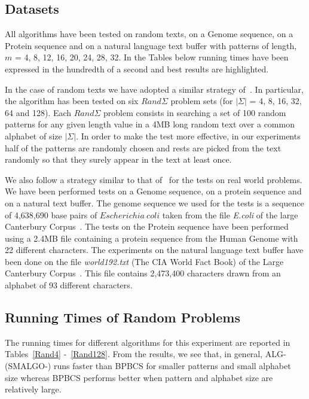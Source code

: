 \documentclass{llncs}
\newcommand{\rom}[1]{\uppercase\expandafter{\romannumeral #1\relax}}
\begin{document}
{\subsection{Datasets}
All algorithms have been tested on random texts, on a Genome sequence, on a Protein sequence and on a natural language text buffer with patterns of length, $m$ = 4, 8, 12, 16, 20, 24, 28, 32. In the Tables below running times have been expressed in the hundredth of a second and best results are highlighted.


In the case of random texts we have adopted a similar strategy of~\cite{CS,CCS}. In particular, the algorithm has been tested on six $Rand\Sigma$ problem sets (for $\vert\Sigma\vert$ = 4, 8, 16, 32, 64 and 128). Each $Rand\Sigma$ problem consists in searching a set of 100 random patterns for any given length value in a 4MB long random text over a common alphabet of size $\vert\Sigma\vert$. In order to make the test more effective, in our experiments half of the patterns are randomly chosen and rests are picked from the text randomly so that they surely appear in the text at least once. 



We also follow a strategy similar to that of~\cite{CS,CCS} for the tests on real world problems. 
We have been performed tests on a Genome sequence, on a protein sequence and on a natural text buffer. The genome sequence we used for the tests is a sequence of 4,638,690 base pairs of $Escherichia~ coli$ taken from the file \emph{E.coli} of the large Canterbury Corpus~\cite{corpus}.
The tests on the Protein sequence have been performed using a 2.4MB file containing a protein sequence from the Human Genome with 22 different characters. The experiments on the natural language text buffer have been done on the file \emph{world192.txt} (The CIA World Fact Book) of the Large Canterbury Corpus~\cite{corpus}. This file contains 2,473,400 characters drawn from an alphabet of 93 different characters.


\subsection{Running Times of Random Problems}

The running times for different algorithms for this experiment are reported in Tables~\ref{Rand4} -~\ref{Rand128}. From the results, we see that, in general, ALG-\rom{1} (SMALGO-\rom{1}) runs faster than BPBCS for smaller patterns and small alphabet size whereas BPBCS performs better when pattern and alphabet size are relatively large.




}
\end{document}
